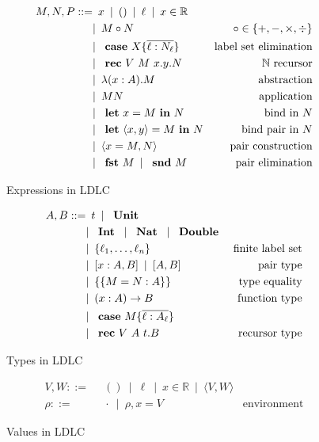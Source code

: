 \begin{figure}
\begin{align*}
 M,N,P ::=
    & \enspace x \enspace|\enspace
      () \enspace|\enspace
      \ell \enspace|\enspace
      x \in \mathbb{R} \\
    & |\enspace M \circ N & \circ \in \{+,-,\times,\div\} \\
    & |\enspace \text{ \textbf{case} } X \{\overline{\ell : N_\ell}\} & \text{label set elimination} \\
    & |\enspace \text{ \textbf{rec} } V~M~x.y.N & \mathbb{N}\text{ recursor} \\
    & |\enspace \lambda (x : A).M & \text{abstraction} \\
    & |\enspace M N & \text{application}\\
    & |\enspace \text{ \textbf{let} } x = M \text{ \textbf{in} } N & \text{bind in $N$}\\
    & |\enspace \text{ \textbf{let} } \langle x, y \rangle = M \text{ \textbf{in} } N & \text{bind pair in $N$} \\
    & |\enspace \langle x = M, N \rangle & \text{pair construction}\\
    & |\enspace \text{ \textbf{fst} } M \enspace|\enspace \text{ \textbf{snd} } M & \text{pair elimination}
\end{align*}
\caption{Expressions in LDLC}
\label{fig:ldlc-expressions}
\end{figure}

\begin{figure}
\begin{align*}
 A, B ::=
    & \enspace t \enspace|\enspace
      \text{ \textbf{Unit} }
    \\ &  |\enspace \text{ \textbf{Int} } \enspace|\enspace
      \text{ \textbf{Nat} } \enspace|\enspace
      \text{ \textbf{Double} } \\
    & |\enspace \{ \ell_1, \dots, \ell_n \} & \text{finite label set} \\
    & |\enspace [x:A,B] \enspace|\enspace [A,B] & \text{pair type} \\
    & |\enspace \{\{ M = N : A \}\} & \text{type equality} \\
    & |\enspace (x:A) \rightarrow B & \text{function type} \\
    & |\enspace \text{ \textbf{case} } M \{\overline{\ell : A_\ell}\} \\
    & |\enspace \text{ \textbf{rec} } V~A~t.B & \text{recursor type}
\end{align*}
\caption{Types in LDLC}
\label{fig:ldlc-types}
\end{figure}

\begin{figure}
\begin{align*}
    V, W ::=
    & \enspace () \enspace|\enspace
      \ell \enspace|\enspace
      x \in \mathbb{R} \enspace
     |\enspace \langle V, W \rangle \\
    \rho ::= & \enspace \cdot \enspace | \enspace \rho, x = V & \text{environment}
\end{align*}
\caption{Values in LDLC}
\label{fig:ldlc-values}
\end{figure}

